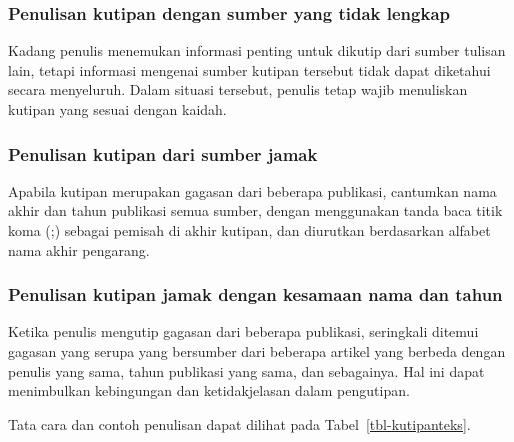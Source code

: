 \documentclass[
  indonesian,
  letterpaper,
]{scrbook}
\begin{document}
\subsubsection{Penulisan kutipan dengan sumber yang tidak
lengkap}\label{penulisan-kutipan-dengan-sumber-yang-tidak-lengkap}

Kadang penulis menemukan informasi penting untuk dikutip dari sumber
tulisan lain, tetapi informasi mengenai sumber kutipan tersebut tidak
dapat diketahui secara menyeluruh. Dalam situasi tersebut, penulis tetap
wajib menuliskan kutipan yang sesuai dengan kaidah.

\subsubsection{Penulisan kutipan dari sumber
jamak}\label{penulisan-kutipan-dari-sumber-jamak}

Apabila kutipan merupakan gagasan dari beberapa publikasi, cantumkan
nama akhir dan tahun publikasi semua sumber, dengan menggunakan tanda
baca titik koma (;) sebagai pemisah di akhir kutipan, dan diurutkan
berdasarkan alfabet nama akhir pengarang.

\subsubsection{Penulisan kutipan jamak dengan kesamaan nama dan
tahun}\label{penulisan-kutipan-jamak-dengan-kesamaan-nama-dan-tahun}

Ketika penulis mengutip gagasan dari beberapa publikasi, seringkali
ditemui gagasan yang serupa yang bersumber dari beberapa artikel yang
berbeda dengan penulis yang sama, tahun publikasi yang sama, dan
sebagainya. Hal ini dapat menimbulkan kebingungan dan ketidakjelasan
dalam pengutipan.

Tata cara dan contoh penulisan dapat dilihat pada
Tabel~\ref{tbl-kutipanteks}.
\end{document}
